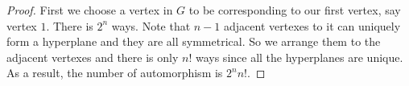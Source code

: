 




\begin{proof}

First we choose a vertex in $G$ to be corresponding to our first vertex, say vertex $1$. There is $2^n$ ways. Note that $n-1$ adjacent vertexes to it can uniquely form a hyperplane and they are all symmetrical. So we arrange them to the adjacent vertexes and there is only $n!$ ways since all the hyperplanes are unique.
As a result, the number of automorphism is $2^nn!$.
\end{proof}
